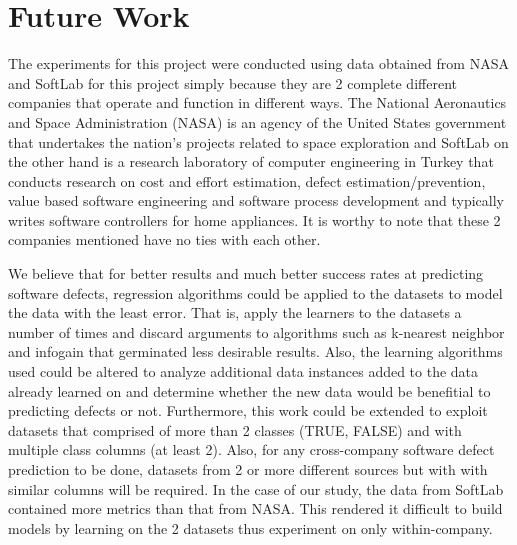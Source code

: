 \documentclass{sig-alternate}
\begin{document}
\section{Future Work}
The experiments for this project were conducted using data obtained from NASA and SoftLab for this project simply because they are 2 complete different companies that operate and function in different ways. 
The National Aeronautics and Space Administration (NASA) is an agency of the United States government that undertakes the nation's projects related to space exploration and SoftLab on the other hand is a research laboratory of computer engineering in Turkey that conducts research on cost and effort estimation, defect estimation/prevention, value based software engineering and software process development and typically writes software controllers for home appliances. It is worthy to note that these 2 companies mentioned have no ties with each other. 

We believe that for better results and much better success rates at predicting software defects, regression algorithms could be applied to the datasets to model the data with the least error. That is, apply the learners to the datasets a number of times and discard arguments to algorithms such as k-nearest neighbor and infogain that germinated less desirable results. Also, the learning algorithms used could be altered to analyze additional data instances added to the data already learned on and determine whether the new data would be benefitial to predicting defects or not. Furthermore, this work could be extended to exploit datasets that comprised of more than 2 classes (TRUE, FALSE) and with multiple class columns (at least 2). Also, for any cross-company software defect prediction to be done, datasets from 2 or more different sources but with with similar columns will be required. In the case of our study, the data from SoftLab contained more metrics than that from NASA. This rendered it difficult to build models by learning on the 2 datasets thus experiment on only within-company.
\end{document}
